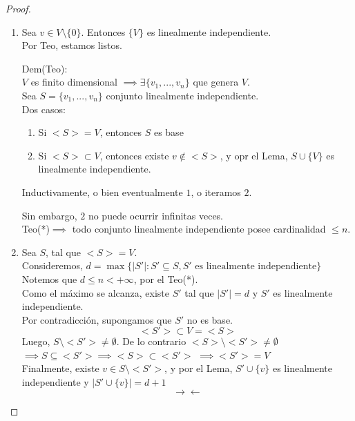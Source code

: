 \documentclass[11pt]{book}
\theoremstyle{definition}
\begin{document}
\begin{proof}
\begin{enumerate}[label=\alph*)]
	\item Sea $v\in V\setminus\{0\}$. Entonces $\{V\}$ es linealmente independiente.\\
	Por Teo, estamos listos.
	
	Dem(Teo):\\
	$V$ es finito dimensional $\implies\exists\{v_1,...,v_n\}$ que genera $V$.\\
	Sea $S=\{v_1,...,v_n\}$ conjunto linealmente independiente.\\
	Dos casos:
	\begin{enumerate}
		\item Si $<S>=V$, entonces $S$ es base
		
		\item Si $<S>\subset V$, entonces existe $v\notin<S>$, y opr el Lema, $S\cup\{V\}$ es linealmente independiente.
	\end{enumerate}
	Inductivamente, o bien eventualmente $1$, o iteramos $2$.
	
	Sin embargo, $2$ no puede ocurrir infinitas veces.\\
	Teo(*)$\implies$ todo conjunto linealmente independiente posee cardinalidad $\leq n$.
	
	\item Sea $S$, tal que $<S>=V$.\\
	Consideremos, $d=\max\{|S'|:S'\subseteq S, S'\textrm{ es linealmente independiente}\}$\\
	Notemos que $d\leq n<+\infty$, por el Teo(*).\\
	Como el máximo se alcanza, existe $S'$ tal que $|S'|=d$ y $S'$ es linealmente independiente.\\
	Por contradicción, supongamos que $S'$ no es base.
	\[
	<S'>\subset V=<S>
	\]
	Luego, $S\setminus<S'>\neq\emptyset$. De lo contrario $<S>\setminus<S'>\neq\emptyset$\\
	$\implies S\subseteq <S'>\implies <S>\subset<S'>$
	$\implies <S'>=V$\\
	Finalmente, existe $v\in S\setminus<S'>$, y por el Lema, $S'\cup\{v\}$ es linealmente independiente y $|S'\cup\{v\}|=d+1$
	\[
	\rightarrow\leftarrow
	\]
\end{enumerate}
\end{proof}
\end{document}
